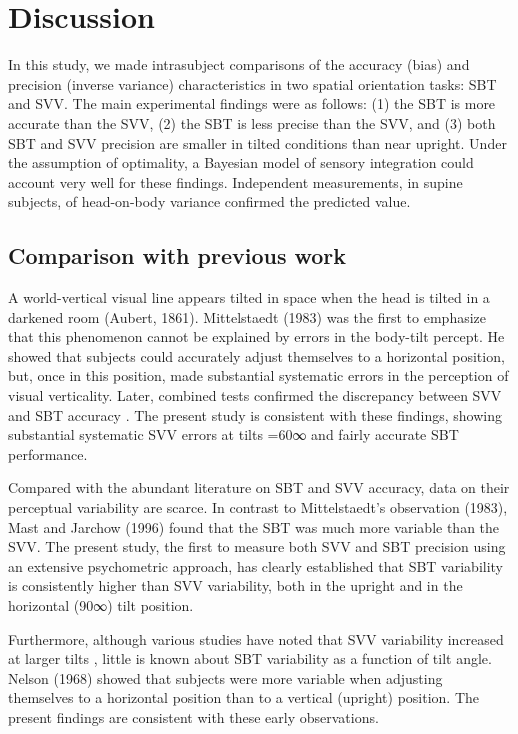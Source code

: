 \section{Discussion}

In this study, we made intrasubject comparisons of the accuracy (bias) and precision (inverse variance) characteristics in two spatial orientation tasks: SBT and SVV. The main experimental findings were as follows: (1) the SBT is more accurate than the SVV, (2) the SBT is less precise than the SVV, and (3) both SBT and SVV precision are smaller in tilted conditions than near upright. Under the assumption of optimality, a Bayesian model of sensory integration could account very well for these findings. Independent measurements, in supine subjects, of head-on-body variance confirmed the predicted value. 


\subsection{Comparison with previous work}
 
A world-vertical visual line appears tilted in space when the head is tilted in a darkened room (Aubert, 1861). Mittelstaedt (1983) was the first to emphasize that this phenomenon cannot be explained by errors in the body-tilt percept. He showed that subjects could accurately adjust themselves to a horizontal position, but, once in this position, made substantial systematic errors in the perception of visual verticality. Later, combined tests confirmed the discrepancy between SVV and SBT accuracy \cite{mast1996, jarchow1999, vanbeuzekom2000, vanbeuzekom2001, kaptein2004, vingerhoets2008}. The present study is consistent with these findings, showing substantial systematic SVV errors at tilts =60∞ and fairly accurate SBT performance. 

Compared with the abundant literature on SBT and SVV accuracy, data on their perceptual variability are scarce. In contrast to Mittelstaedt's observation (1983), Mast and Jarchow (1996) found that the SBT was much more variable than the SVV. The present study, the first to measure both SVV and SBT precision using an extensive psychometric approach, has clearly established that SBT variability is consistently higher than SVV variability, both in the upright and in the horizontal (90∞) tilt position. 

Furthermore, although various studies have noted that SVV variability increased at larger tilts \cite{schone1964, schone1968, udodehaes1970, vanbeuzekom2001, devrijer2008}, little is known about SBT variability as a function of tilt angle. Nelson (1968) showed that subjects were more variable when adjusting themselves to a horizontal position than to a vertical (upright) position. The present findings are consistent with these early observations. 



